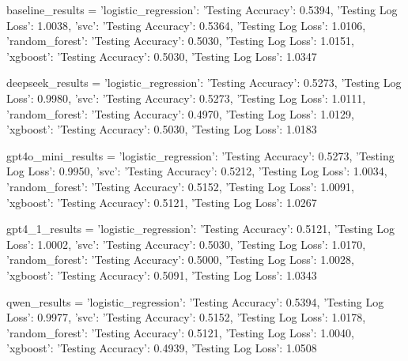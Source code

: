 baseline_results = {
    'logistic_regression': {'Testing Accuracy': 0.5394, 'Testing Log Loss': 1.0038},
    'svc': {'Testing Accuracy': 0.5364, 'Testing Log Loss': 1.0106},
    'random_forest': {'Testing Accuracy': 0.5030, 'Testing Log Loss': 1.0151},
    'xgboost': {'Testing Accuracy': 0.5030, 'Testing Log Loss': 1.0347}
}

deepseek_results = {
    'logistic_regression': {'Testing Accuracy': 0.5273, 'Testing Log Loss': 0.9980},
    'svc': {'Testing Accuracy': 0.5273, 'Testing Log Loss': 1.0111},
    'random_forest': {'Testing Accuracy': 0.4970, 'Testing Log Loss': 1.0129},
    'xgboost': {'Testing Accuracy': 0.5030, 'Testing Log Loss': 1.0183}
}

gpt4o_mini_results = {
    'logistic_regression': {'Testing Accuracy': 0.5273, 'Testing Log Loss': 0.9950},
    'svc': {'Testing Accuracy': 0.5212, 'Testing Log Loss': 1.0034},
    'random_forest': {'Testing Accuracy': 0.5152, 'Testing Log Loss': 1.0091},
    'xgboost': {'Testing Accuracy': 0.5121, 'Testing Log Loss': 1.0267}
}

gpt4_1_results = {
    'logistic_regression': {'Testing Accuracy': 0.5121, 'Testing Log Loss': 1.0002},
    'svc': {'Testing Accuracy': 0.5030, 'Testing Log Loss': 1.0170},
    'random_forest': {'Testing Accuracy': 0.5000, 'Testing Log Loss': 1.0028},
    'xgboost': {'Testing Accuracy': 0.5091, 'Testing Log Loss': 1.0343}
}


qwen_results = {
    'logistic_regression': {'Testing Accuracy': 0.5394, 'Testing Log Loss': 0.9977},
    'svc': {'Testing Accuracy': 0.5152, 'Testing Log Loss': 1.0178},
    'random_forest': {'Testing Accuracy': 0.5121, 'Testing Log Loss': 1.0040},
    'xgboost': {'Testing Accuracy': 0.4939, 'Testing Log Loss': 1.0508}
}


